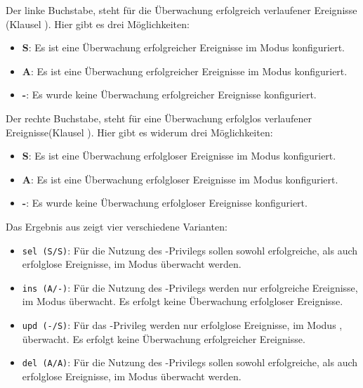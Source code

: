        Der linke Buchstabe, steht f\"ur die \"Uberwachung erfolgreich verlaufener Ereignisse (Klausel ). Hier gibt es drei M\"oglichkeiten:
        \begin{itemize}
          \item \textbf{S}: Es ist eine \"Uberwachung erfolgreicher Ereignisse im Modus  konfiguriert.
          \item \textbf{A}: Es ist eine \"Uberwachung erfolgreicher Ereignisse im Modus  konfiguriert.
          \item \textbf{-}: Es wurde keine \"Uberwachung erfolgreicher Ereignisse konfiguriert.
        \end{itemize}
        Der rechte Buchstabe, steht f\"ur eine \"Uberwachung erfolglos verlaufener Ereignisse(Klausel ). Hier gibt es widerum drei M\"oglichkeiten:
        \begin{itemize}
          \item \textbf{S}: Es ist eine \"Uberwachung erfolgloser Ereignisse im Modus  konfiguriert.
          \item \textbf{A}: Es ist eine \"Uberwachung erfolgloser Ereignisse im Modus  konfiguriert.
          \item \textbf{-}: Es wurde keine \"Uberwachung erfolgloser Ereignisse konfiguriert.
        \end{itemize}
        Das Ergebnis aus  zeigt vier verschiedene Varianten:
        \begin{itemize}
          \item \texttt{sel (S/S)}: F\"ur die Nutzung des -Privilegs sollen sowohl erfolgreiche, als auch erfolglose Ereignisse, im Modus  \"uberwacht werden.
          \item \texttt{ins (A/-)}: F\"ur die Nutzung des -Privilegs werden nur erfolgreiche Ereignisse, im Modus  \"uberwacht. Es erfolgt keine \"Uberwachung erfolgloser Ereignisse.
          \item \texttt{upd (-/S)}: F\"ur das -Privileg werden nur erfolglose Ereignisse, im Modus , \"uberwacht. Es erfolgt keine \"Uberwachung erfolgreicher Ereignisse.
          \item \texttt{del (A/A)}: F\"ur die Nutzung des -Privilegs sollen sowohl erfolgreiche, als auch erfolglose Ereignisse, im Modus  \"uberwacht werden.
        \end{itemize}
